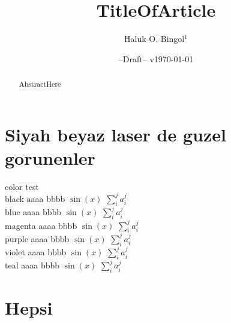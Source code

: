 \documentclass[amsfonts,aps, prl,nofootinbib, twocolumn,showpacs, showkeys,longbibliography]{revtex4-1}
\newcommand{\hbTimeStamp}{{\color{red}--Draft-- v\today}} %
\begin{document}
\title{
	TitleOfArticle
}
\author{Haluk O. Bingol$^{1}$}

\date{\hbTimeStamp}

\begin{abstract}
	AbstractHere
\end{abstract}


\maketitle





\section{Siyah beyaz laser de guzel gorunenler}
color test\\
{\color{black} black aaaa bbbb $\sin(x)$ $\sum_{i}^{j} a_{i}^{j}$}\\
{\color{blue} blue aaaa bbbb $\sin(x)$ $\sum_{i}^{j} a_{i}^{j}$}\\
{\color{magenta} magenta aaaa bbbb $\sin(x)$ $\sum_{i}^{j} a_{i}^{j}$}\\
{\color{purple} purple aaaa bbbb $\sin(x)$ $\sum_{i}^{j} a_{i}^{j}$}\\
{\color{violet} violet aaaa bbbb $\sin(x)$ $\sum_{i}^{j} a_{i}^{j}$}\\
{\color{teal} teal aaaa bbbb $\sin(x)$ $\sum_{i}^{j} a_{i}^{j}$}\\




\section{Hepsi}
\end{document}
